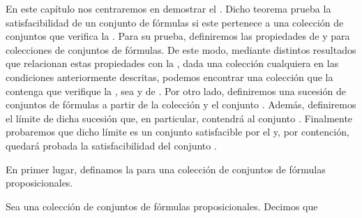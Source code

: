 %
\begin{isabellebody}%
%
%
\isadelimtheory
%
\endisadelimtheory
%
\isatagtheory
%
\endisatagtheory
{\isafoldtheory}%
%
\isadelimtheory
%
\endisadelimtheory
%
\begin{isamarkuptext}%
%
\end{isamarkuptext}\isamarkuptrue%
%
\begin{isamarkuptext}%
En este capítulo nos centraremos en demostrar el .
  Dicho teorema prueba la satisfacibilidad de un conjunto de fórmulas  si este pertenece a una 
  colección de conjuntos  que verifica la . Para su 
  prueba, definiremos las propiedades de  y  para
  colecciones de conjuntos de fórmulas. De este modo, mediante distintos resultados que relacionan
  estas propiedades con la , dada una colección  
  cualquiera en las condiciones anteriormente descritas, podemos encontrar una colección  que la 
  contenga que verifique la , sea  y de . Por otro lado, definiremos una sucesión de conjuntos de
  fórmulas a partir de la colección  y el conjunto . Además, definiremos el límite de dicha
  sucesión que, en particular, contendrá al conjunto . Finalmente probaremos que dicho límite es 
  un conjunto satisfacible por el  y, por contención, quedará probada la 
  satisfacibilidad del conjunto .%
\end{isamarkuptext}\isamarkuptrue%
%
\isadelimdocument
%
\endisadelimdocument
%
\isatagdocument
%
\isamarkuptrue%
%
\endisatagdocument
{\isafolddocument}%
%
\isadelimdocument
%
\endisadelimdocument
%
\begin{isamarkuptext}%
En primer lugar, definamos la  para una colección 
  de conjuntos de fórmulas proposicionales.%
\end{isamarkuptext}\isamarkuptrue%
%
\begin{isamarkuptext}%
\begin{definicion}
    Sea  una colección de conjuntos de fórmulas proposicionales. Decimos que

\end{definicion}
\end{isamarkuptext}
\end{isabellebody}
